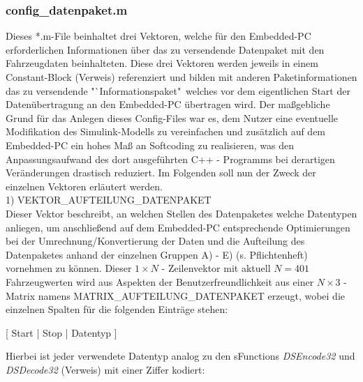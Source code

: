 \documentclass[fontsize = 12pt, paper = a4]{scrreprt}
\begin{document}
\subsubsection{config\_datenpaket.m}

Dieses *.m-File beinhaltet drei Vektoren, welche für den Embedded-PC erforderlichen Informationen über das zu  versendende Datenpaket mit den Fahrzeugdaten beinhalteten. Diese drei Vektoren werden jeweils in einem Constant-Block (Verweis) referenziert und bilden mit anderen Paketinformationen das zu versendende "`Informationspaket"\, welches vor dem eigentlichen Start der Datenübertragung an den Embedded-PC übertragen wird. Der maßgebliche Grund für das Anlegen dieses Config-Files war es, dem Nutzer eine eventuelle Modifikation des Simulink-Modells zu vereinfachen und zusätzlich auf dem Embedded-PC ein hohes Maß an Softcoding zu realisieren, was den Anpassungsaufwand des dort ausgeführten C++ - Programms bei derartigen Veränderungen drastisch reduziert. Im Folgenden soll nun der Zweck der einzelnen Vektoren erläutert werden. \\

1) VEKTOR\_AUFTEILUNG\_DATENPAKET  \\  

Dieser Vektor beschreibt, an welchen Stellen des Datenpaketes welche Datentypen anliegen, um anschließend auf dem Embedded-PC entsprechende Optimierungen bei der Umrechnung/Konvertierung der Daten und die Aufteilung des Datenpaketes anhand der einzelnen Gruppen A) - E) (s. Pflichtenheft) vornehmen zu können. Dieser $1 \times N$ - Zeilenvektor mit aktuell $N = 401$ Fahrzeugwerten wird aus Aspekten der Benutzerfreundlichkeit aus einer $N \times 3$ - Matrix namens MATRIX\_AUFTEILUNG\_DATENPAKET erzeugt, wobei die einzelnen Spalten für die folgenden Einträge stehen: 

\begin{center}
[ Start | Stop | Datentyp ]
\end{center}

Hierbei ist jeder verwendete Datentyp analog zu den sFunctions \textit{DSEncode32} und \\ \textit{DSDecode32} (Verweis) mit einer Ziffer kodiert:

\vspace*{-3mm}
\end{document}
